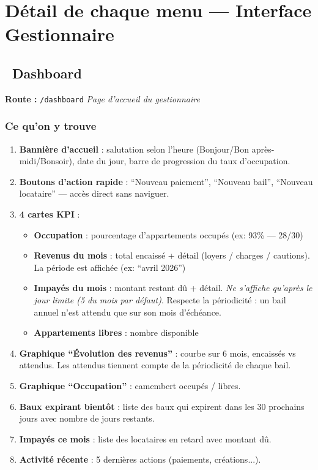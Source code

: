 \documentclass[12pt,a4paper]{article}
\begin{document}
\newpage
\section{D\'etail de chaque menu --- Interface Gestionnaire}


\subsection{\faChartBar\ Dashboard}
\textbf{Route :} \texttt{/dashboard} \hfill \textit{Page d'accueil du gestionnaire}

\subsubsection{Ce qu'on y trouve}
\begin{enumerate}
\item \textbf{Banni\`ere d'accueil} : salutation selon l'heure (Bonjour/Bon apr\`es-midi/Bonsoir), date du jour, barre de progression du taux d'occupation.
\item \textbf{Boutons d'action rapide} : ``Nouveau paiement'', ``Nouveau bail'', ``Nouveau locataire'' --- acc\`es direct sans naviguer.
\item \textbf{4 cartes KPI} :
  \begin{itemize}
  \item \textbf{Occupation} : pourcentage d'appartements occup\'es (ex: 93\% --- 28/30)
  \item \textbf{Revenus du mois} : total encaiss\'e + d\'etail (loyers / charges / cautions). La p\'eriode est affich\'ee (ex: ``avril 2026'')
  \item \textbf{Impay\'es du mois} : montant restant d\^u + d\'etail. \textit{Ne s'affiche qu'apr\`es le jour limite (5 du mois par d\'efaut)}. Respecte la p\'eriodicit\'e : un bail annuel n'est attendu que sur son mois d'\'ech\'eance.
  \item \textbf{Appartements libres} : nombre disponible
  \end{itemize}
\item \textbf{Graphique ``\'Evolution des revenus''} : courbe sur 6 mois, encaiss\'es vs attendus. Les attendus tiennent compte de la p\'eriodicit\'e de chaque bail.
\item \textbf{Graphique ``Occupation''} : camembert occup\'es / libres.
\item \textbf{Baux expirant bient\^ot} : liste des baux qui expirent dans les 30 prochains jours avec nombre de jours restants.
\item \textbf{Impay\'es ce mois} : liste des locataires en retard avec montant d\^u.
\item \textbf{Activit\'e r\'ecente} : 5 derni\`eres actions (paiements, cr\'eations...).
\end{enumerate}
\end{document}
